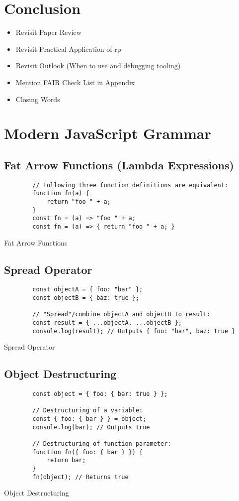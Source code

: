 \documentclass[12pt,a4paper]{article}
\begin{document}
\section{Conclusion}
\begin{itemize}
	\item Revisit Paper Review
	\item Revisit Practical Application of rp
	\item Revisit Outlook (When to use and debugging tooling)
	\item Mention FAIR Check List in Appendix
	\item Closing Words
\end{itemize}

\appendix

\section{Modern JavaScript Grammar}
\label{sec:modern-javascript-grammar}

\subsection{Fat Arrow Functions (Lambda Expressions)}
\begin{listing}[H]
	\begin{verbatim}
		// Following three function definitions are equivalent:
		function fn(a) {
			return "foo " + a;
		}
		const fn = (a) => "foo " + a;
		const fn = (a) => { return "foo " + a; }
	\end{verbatim}
	\caption{Fat Arrow Functions}
\end{listing}

\subsection{Spread Operator}
\begin{listing}[H]
	\begin{verbatim}
		const objectA = { foo: "bar" };
		const objectB = { baz: true };

		// "Spread"/combine objectA and objectB to result:
		const result = { ...objectA, ...objectB };
		console.log(result); // Outputs { foo: "bar", baz: true }
	\end{verbatim}
	\caption{Spread Operator}
\end{listing}

\subsection{Object Destructuring}
\begin{listing}[H]
	\begin{verbatim}
		const object = { foo: { bar: true } };

		// Destructuring of a variable:
		const { foo: { bar } } = object;
		console.log(bar); // Outputs true

		// Destructuring of function parameter:
		function fn({ foo: { bar } }) {
			return bar;
		}
		fn(object); // Returns true
	\end{verbatim}
	\caption{Object Destructuring}
\end{listing}
\end{document}
